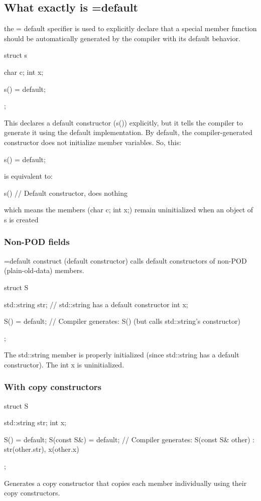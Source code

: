 \documentclass{report}
\begin{document}
    \subsection{What exactly is =default}
    \bigbreak \noindent 
    the = default specifier is used to explicitly declare that a special member function should be automatically generated by the compiler with its default behavior.
    \bigbreak \noindent 
    \begin{cppcode}
        struct s {
            char c; 
            int x; 

            s() = default;
        };
    \end{cppcode}
    \bigbreak \noindent 
    This declares a default constructor (s()) explicitly, but it tells the compiler to generate it using the default implementation.
    \bigbreak \noindent 
    By default, the compiler-generated constructor does not initialize member variables. So, this:
    \bigbreak \noindent 
    \begin{cppcode}
    s() = default;
    \end{cppcode}
    \bigbreak \noindent 
    is equivalent to:
    \bigbreak \noindent 
    \begin{cppcode}
    s() {}  // Default constructor, does nothing
    \end{cppcode}
    \bigbreak \noindent 
    which means the members (char c; int x;) remain uninitialized when an object of s is created
    \bigbreak \noindent 
    \subsubsection{Non-POD fields}
    \bigbreak \noindent 
    =default construct (default constructor) calls default constructors of non-POD (plain-old-data) members.
    \bigbreak \noindent 
    \begin{cppcode}
        struct S {
            std::string str; // std::string has a default constructor
            int x;

            S() = default; // Compiler generates: S() {} (but calls std::string's constructor)
        };
    \end{cppcode}
    \bigbreak \noindent 
    The std::string member is properly initialized (since std::string has a default constructor). The int x is uninitialized.

    \bigbreak \noindent 
    \subsubsection{With copy constructors}
    \bigbreak \noindent 
    \begin{cppcode}
        struct S {
            std::string str;
            int x;

            S() = default;
            S(const S&) = default;  // Compiler generates: S(const S& other) : str(other.str), x(other.x) {}
        };
    \end{cppcode}
    \bigbreak \noindent 
    Generates a copy constructor that copies each member individually using their copy constructors.
\end{document}
